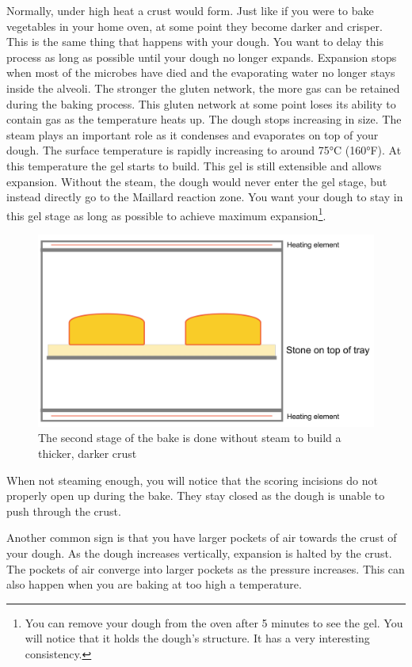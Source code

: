 Normally, under high heat a crust would form. Just like
if you were to bake vegetables in your home oven, at some point
they become darker and crisper. This is the same thing that
happens with your dough. You want to delay this process
as long as possible until your dough no longer expands.
Expansion stops when most of the microbes have died and
the evaporating water no longer stays inside the alveoli.
The stronger the gluten network, the more gas can be retained
during the baking process. This gluten network at some point
loses its ability to contain gas as the temperature heats
up. The dough stops increasing in size. The steam plays
an important role as it condenses and evaporates on top
of your dough. The surface temperature is rapidly increasing
to around 75°C (160°F). At this temperature the gel starts
to build. This gel is still extensible and allows expansion.
Without the steam, the dough would never enter the gel stage,
but instead directly go to the Maillard reaction zone. You
want your dough to stay in this gel stage as long as possible
to achieve maximum expansion\footnote{You can remove your
dough from the oven after 5 minutes to see the gel. You will notice
that it holds the dough's structure. It has a very interesting consistency.}.

\begin{figure}[!htb]
  \includegraphics[width=\textwidth]{baking-process-stage-2.jpg}
  \caption{The second stage of the bake is done without steam to build
  a thicker, darker crust}
\end{figure}

When not steaming enough, you will notice that the scoring
incisions do not properly open up during the bake. They stay
closed as the dough is unable to push through the crust.

Another common sign is that you have larger pockets
of air towards the crust of your dough. As the dough increases
vertically, expansion is halted by the crust. The pockets
of air converge into larger pockets as the pressure increases.
This can also happen when you are baking at too high a temperature.

